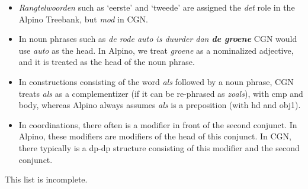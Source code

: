 \documentclass[12pt]{article}
\begin{document}
\begin{itemize}
\item {\em Rangtelwoorden} such as `eerste' and `tweede' are assigned
  the {\em det} role in the Alpino Treebank, but {\em mod} in CGN.

\item In noun phrases such as {\em de rode auto is duurder dan {\bf de
      groene}} CGN would use {\em auto} as the head. In Alpino, we
      treat {\em groene} as a nominalized adjective, and it is treated
      as the head of the noun phrase.

\item In constructions consisting of the word {\em als} followed by a
  noun phrase, CGN treats {\em als} as a complementizer (if it can be
  re-phrased as {\em zoals}), with cmp and body, whereas Alpino always
  assumes {\em als} is a preposition (with hd and obj1).

\item In coordinations, there often is a modifier in front of the
  second conjunct. In Alpino, these modifiers are modifiers of the
  head of this conjunct. In CGN, there typically is a dp-dp structure
  consisting of this modifier and the second conjunct.

\end{itemize}

This list is incomplete.


\end{document}
